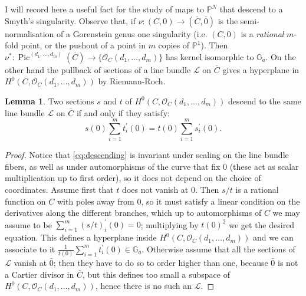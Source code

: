 \documentclass[11pt]{amsart}
\newcommand{\PP}{\mathbb P}
\newcommand{\OO}{\mathcal{O}}
\renewcommand{\to}{\rightarrow}
\newcommand{\Pic}{\operatorname{Pic}}
\theoremstyle{definition}
\newtheorem{lemma}[thm]{Lemma}
\theoremstyle{definition}
\begin{document}
I will record here a useful fact for the study of maps to $\PP^N$ that descend to a Smyth's singularity. Observe that, if $\nu\colon (C,0)\to (\overline{C},\bar{0})$ is the semi-normalisation of a Gorenstein genus one singularity (i.e. $(C,0)$ is a \emph{rational} $m$-fold point, or the pushout of a point in $m$ copies of $\PP^1$). Then $\nu^*\colon \Pic^{(d_1,\ldots,d_m)}(\overline{C})\to \{\OO_{C}(d_1,\ldots,d_m)\}$ has kernel isomorphic to $\mathbb G_a$. On the other hand the pullback of sections of a line bundle $\mathcal L$ on $\overline{C}$ gives a hyperplane in $H^0(C,\OO_{C}(d_1,\ldots,d_m))$ by Riemann-Roch.
\begin{lemma}
 Two sections $s$ and $t$ of $H^0(C,\OO_{C}(d_1,\ldots,d_m))$ descend to the same line bundle $\mathcal L$ on $\overline{C}$ if and only if they satisfy: \begin{equation}\label{eq:descending}s(0)\sum_{i=1}^m t_i^\prime(0)=t(0)\sum_{i=1}^m s_i^\prime(0).\end{equation}
\end{lemma}
\begin{proof}
 Notice that \eqref{eq:descending} is invariant under scaling on the line bundle fibers, as well as under automorphisms of the curve that fix $0$ (these act as scalar multiplication up to first order), so it does not depend on the choice of coordinates. Assume first that $t$ does not vanish at $0$. Then $s/t$ is a rational function on $C$ with poles away from $0$, so it must satisfy a linear condition on the derivatives along the different branches, which up to automorphisms of $C$ we may assume to be $\sum_{i=1}^m (s/t)_i^\prime(0)=0$; multiplying by $t(0)^2$ we get the desired equation. This defines a hyperplane inside $H^0(C,\OO_{C}(d_1,\ldots,d_m))$ and we can associate to it $\frac{1}{t(0)}\sum_{i=1}^m t_i^\prime(0)\in \mathbb G_a$. Otherwise assume that all the sections of $\mathcal L$ vanish at $\bar{0}$; then they have to do so to order higher than one, because $\bar{0}$ is not a Cartier divisor in $\overline{C}$, but this defines too small a subspace of $H^0(C,\OO_{C}(d_1,\ldots,d_m))$, hence there is no such an $\mathcal L$.
\end{proof}
\end{document}
